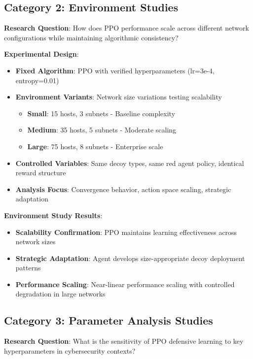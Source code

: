 \documentclass[12pt]{article}
\theoremstyle{definition}
\theoremstyle{plain}
\begin{document}
\subsection{Category 2: Environment Studies}

\textbf{Research Question}: How does PPO performance scale across different network configurations while maintaining algorithmic consistency?

\textbf{Experimental Design}:
\begin{itemize}
\item \textbf{Fixed Algorithm}: PPO with verified hyperparameters (lr=3e-4, entropy=0.01)
\item \textbf{Environment Variants}: Network size variations testing scalability
  \begin{itemize}
    \item \textbf{Small}: 15 hosts, 3 subnets - Baseline complexity
    \item \textbf{Medium}: 35 hosts, 5 subnets - Moderate scaling
    \item \textbf{Large}: 75 hosts, 8 subnets - Enterprise scale
  \end{itemize}
\item \textbf{Controlled Variables}: Same decoy types, same red agent policy, identical reward structure
\item \textbf{Analysis Focus}: Convergence behavior, action space scaling, strategic adaptation
\end{itemize}

\textbf{Environment Study Results}:
\begin{itemize}
\item \textbf{Scalability Confirmation}: PPO maintains learning effectiveness across network sizes
\item \textbf{Strategic Adaptation}: Agent develops size-appropriate decoy deployment patterns
\item \textbf{Performance Scaling}: Near-linear performance scaling with controlled degradation in large networks
\end{itemize}

\subsection{Category 3: Parameter Analysis Studies}

\textbf{Research Question}: What is the sensitivity of PPO defensive learning to key hyperparameters in cybersecurity contexts?
\end{document}
